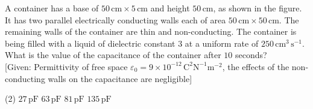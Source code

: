 \item A container has a base of \( 50 \, \text{cm} \times 5 \, \text{cm} \) and height \( 50 \, \text{cm} \), as shown in the figure. It has two parallel electrically conducting walls each of area \( 50 \, \text{cm} \times 50 \, \text{cm} \). The remaining walls of the container are thin and non-conducting. The container is being filled with a liquid of dielectric constant \( 3 \) at a uniform rate of \( 250 \, \text{cm}^3 \, \text{s}^{-1} \). What is the value of the capacitance of the container after \( 10 \) seconds?\\[2mm] [Given: Permittivity of free space \( \varepsilon_0 = 9 \times 10^{-12} \, \text{C}^2 \text{N}^{-1} \text{m}^{-2} \), the effects of the non-conducting walls on the capacitance are negligible]
    \begin{center}
    \end{center}
        \begin{tasks}(2)
            \task \( 27 \, \text{pF} \)
            \task \( 63 \, \text{pF} \)\ans
            \task \( 81 \, \text{pF} \)
            \task \( 135 \, \text{pF} \)
        \end{tasks}